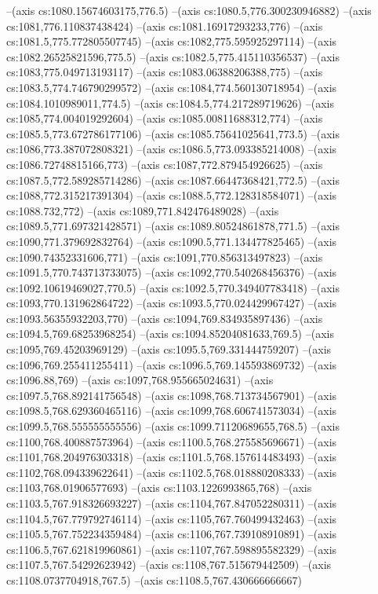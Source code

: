 --(axis cs:1080.15674603175,776.5)
--(axis cs:1080.5,776.300230946882)
--(axis cs:1081,776.110837438424)
--(axis cs:1081.16917293233,776)
--(axis cs:1081.5,775.772805507745)
--(axis cs:1082,775.595925297114)
--(axis cs:1082.26525821596,775.5)
--(axis cs:1082.5,775.415110356537)
--(axis cs:1083,775.049713193117)
--(axis cs:1083.06388206388,775)
--(axis cs:1083.5,774.746790299572)
--(axis cs:1084,774.560130718954)
--(axis cs:1084.1010989011,774.5)
--(axis cs:1084.5,774.217289719626)
--(axis cs:1085,774.004019292604)
--(axis cs:1085.00811688312,774)
--(axis cs:1085.5,773.672786177106)
--(axis cs:1085.75641025641,773.5)
--(axis cs:1086,773.387072808321)
--(axis cs:1086.5,773.093385214008)
--(axis cs:1086.72748815166,773)
--(axis cs:1087,772.879454926625)
--(axis cs:1087.5,772.589285714286)
--(axis cs:1087.66447368421,772.5)
--(axis cs:1088,772.315217391304)
--(axis cs:1088.5,772.128318584071)
--(axis cs:1088.732,772)
--(axis cs:1089,771.842476489028)
--(axis cs:1089.5,771.697321428571)
--(axis cs:1089.80524861878,771.5)
--(axis cs:1090,771.379692832764)
--(axis cs:1090.5,771.134477825465)
--(axis cs:1090.74352331606,771)
--(axis cs:1091,770.856313497823)
--(axis cs:1091.5,770.743713733075)
--(axis cs:1092,770.540268456376)
--(axis cs:1092.10619469027,770.5)
--(axis cs:1092.5,770.349407783418)
--(axis cs:1093,770.131962864722)
--(axis cs:1093.5,770.024429967427)
--(axis cs:1093.56355932203,770)
--(axis cs:1094,769.834935897436)
--(axis cs:1094.5,769.68253968254)
--(axis cs:1094.85204081633,769.5)
--(axis cs:1095,769.45203969129)
--(axis cs:1095.5,769.331444759207)
--(axis cs:1096,769.255411255411)
--(axis cs:1096.5,769.145593869732)
--(axis cs:1096.88,769)
--(axis cs:1097,768.955665024631)
--(axis cs:1097.5,768.892141756548)
--(axis cs:1098,768.713734567901)
--(axis cs:1098.5,768.629360465116)
--(axis cs:1099,768.606741573034)
--(axis cs:1099.5,768.555555555556)
--(axis cs:1099.71120689655,768.5)
--(axis cs:1100,768.400887573964)
--(axis cs:1100.5,768.275585696671)
--(axis cs:1101,768.204976303318)
--(axis cs:1101.5,768.157614483493)
--(axis cs:1102,768.094339622641)
--(axis cs:1102.5,768.018880208333)
--(axis cs:1103,768.01906577693)
--(axis cs:1103.1226993865,768)
--(axis cs:1103.5,767.918326693227)
--(axis cs:1104,767.847052280311)
--(axis cs:1104.5,767.779792746114)
--(axis cs:1105,767.760499432463)
--(axis cs:1105.5,767.752234359484)
--(axis cs:1106,767.739108910891)
--(axis cs:1106.5,767.621819960861)
--(axis cs:1107,767.598895582329)
--(axis cs:1107.5,767.54292623942)
--(axis cs:1108,767.515679442509)
--(axis cs:1108.0737704918,767.5)
--(axis cs:1108.5,767.430666666667)
